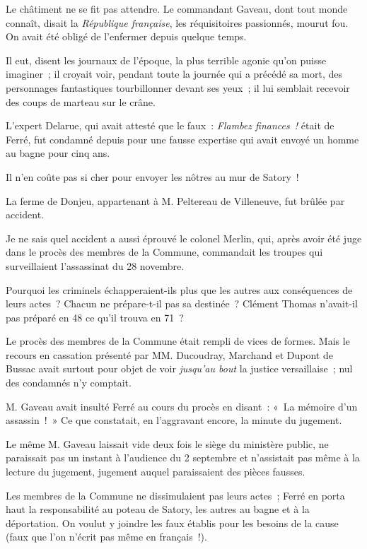 \documentclass[french,twoside]{book} %
\begin{document}
\noindent Le châtiment ne se fit pas attendre. Le commandant Gaveau, dont tout monde connaît, disait la \emph{République française}, les réquisitoires passionnés, mourut fou. On avait été obligé de l’enfermer depuis quelque temps.\par
Il eut, disent les journaux de l’époque, la plus terrible agonie qu’on puisse imaginer ; il croyait voir, pendant toute la journée qui a précédé sa mort, des personnages fantastiques tourbillonner devant ses yeux ; il lui semblait recevoir des coups de marteau sur le crâne.\par
L’expert Delarue, qui avait attesté que le faux : \emph{Flambez finances !} était de Ferré, fut condamné depuis pour une fausse expertise qui avait envoyé un homme au bagne pour cinq ans.\par
Il n’en coûte pas si cher pour envoyer les nôtres au mur de Satory !\par
 La ferme de Donjeu, appartenant à M. Peltereau de Villeneuve, fut brûlée par accident.\par
Je ne sais quel accident a aussi éprouvé le colonel Merlin, qui, après avoir été juge dans le procès des membres de la Commune, commandait les troupes qui surveillaient l’assassinat du 28 novembre.\par
Pourquoi les criminels échapperaient-ils plus que les autres aux conséquences de leurs actes ? Chacun ne prépare-t-il pas sa destinée ? Clément Thomas n’avait-il pas préparé en 48 ce qu’il trouva en 71 ?\par
Le procès des membres de la Commune était rempli de vices de formes. Mais le recours en cassation présenté par MM. Ducoudray, Marchand et Dupont de Bussac avait surtout pour objet de voir \emph{jusqu’au bout} la justice versaillaise ; nul des condamnés n’y comptait.\par
M. Gaveau avait insulté Ferré au cours du procès en disant : « La mémoire d’un assassin ! » Ce que constatait, en l’aggravant encore, la minute du jugement.\par
Le même M. Gaveau laissait vide deux fois le siège du ministère public, ne paraissait pas un instant à l’audience du 2 septembre et n’assistait pas même à la lecture du jugement, jugement auquel paraissaient des pièces fausses.\par
 Les membres de la Commune ne dissimulaient pas leurs actes ; Ferré en porta haut la responsabilité au poteau de Satory, les autres au bagne et à la déportation. On voulut y joindre les faux établis pour les besoins de la cause (faux que l’on n’écrit pas même en français !).\par
\end{document}
